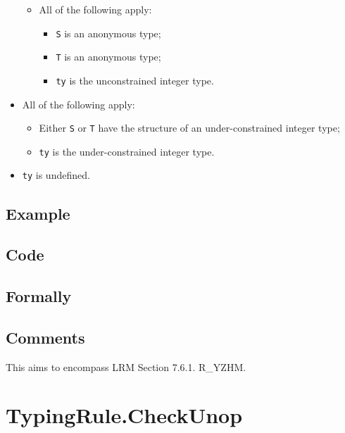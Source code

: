 \documentclass{book}
\begin{document}
\begin{itemize}
\begin{itemize}
      \item All of the following apply:
        \begin{itemize}
        \item \texttt{S} is an anonymous type;
        \item \texttt{T} is an anonymous type;
	\item \texttt{ty} is the unconstrained integer type. 
        \end{itemize}
    \end{itemize}

  \item All of the following apply:
    \begin{itemize}
    \item Either \texttt{S} or \texttt{T} have the structure of an under-constrained integer type;
    \item \texttt{ty} is the under-constrained integer type. 
    \end{itemize}

  \item \texttt{ty} is undefined.
  \end{itemize}

  \subsection{Example}

  \subsection{Code}

\begin{emptyformal}
    \subsection{Formally}
\end{emptyformal}

\subsection{Comments}
    This aims to encompass LRM Section 7.6.1. R\_YZHM.

\section{TypingRule.CheckUnop \label{sec:TypingRule.CheckUnop}}
\end{document}
